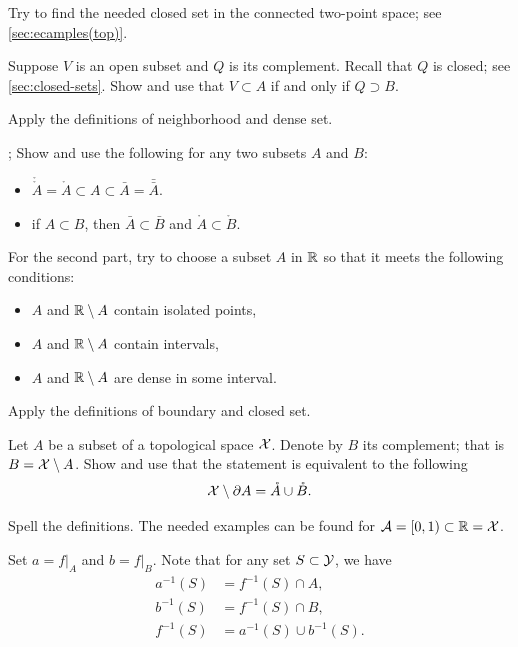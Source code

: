 Try to find the needed closed set in the connected two-point space; see \ref{sec:ecamples(top)}.

Suppose $V$ is an open subset and $Q$ is its complement.
Recall that $Q$ is closed; see \ref{sec:closed-sets}.
Show and use that $V\subset A$ if and only if $Q\supset B$.

Apply the definitions of neighborhood and dense set.

\parbf{\ref{ex:kuratowski}};
Show and use the following for any two subsets $A$ and $B$:
\begin{itemize}
\item $\mathring{\mathring A}=\mathring A\subset A\subset \bar A=\bar{\bar A}$.
\item if $A\subset B$, then $\bar A\subset \bar B$ and
$\mathring A\subset \mathring B$.
\end{itemize}

For the second part, try to choose a subset $A$ in $\mathbb{R}$ so that it meets the following conditions:
\begin{itemize}
\item $A$ and $\mathbb{R}\setminus A$ contain isolated points,
\item $A$ and $\mathbb{R}\setminus A$ contain intervals,
\item $A$ and $\mathbb{R}\setminus A$ are dense in some interval.
\end{itemize}

Apply the definitions of boundary and closed set.

Let $A$ be a subset of a topological space $\mathcal{X}$.
Denote by $B$ its complement; that is $B\z=\c{X}\setminus A$.
Show and use that the statement is equivalent to the following
\[\mathcal{X}\setminus\partial A =\mathring A\cup \mathring B.\]

Spell the definitions.
The needed examples can be found for $\mathcal{A}=[0,1)\subset \mathbb{R}=\mathcal{X}$.

Set $a=f|_A$ and $b=f|_{B}$.
Note that for any set $S\subset \mathcal{Y}$, we have
\begin{align*}
a^{-1}(S)&=f^{-1}(S)\cap A,
\\
b^{-1}(S)&=f^{-1}(S)\cap B,
\\
f^{-1}(S)&=a^{-1}(S)\cup b^{-1}(S).
\end{align*}

